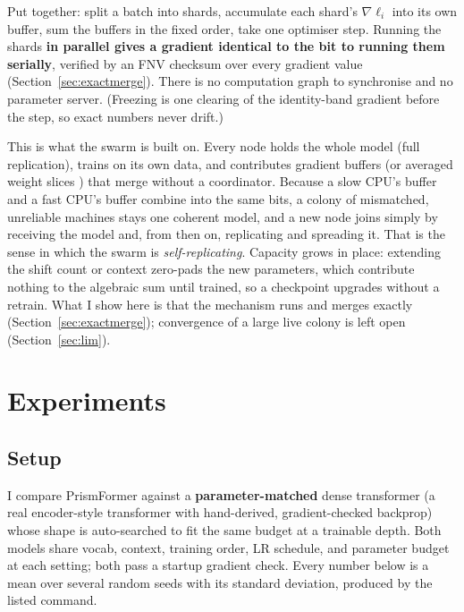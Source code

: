 \documentclass[11pt]{article}
\begin{document}
Put together: split a batch into shards, accumulate each shard's $\nabla \ell_i$ into its own buffer,
sum the buffers in the fixed order, take one optimiser step. Running the shards \textbf{in parallel
gives a gradient identical to the bit to running them serially}, verified by an FNV checksum over every
gradient value (Section~\ref{sec:exactmerge}). There is no computation graph to synchronise and no
parameter server. (Freezing is one clearing of the identity-band gradient before the step, so exact
numbers never drift.)

This is what the swarm is built on. Every node holds the whole model (full replication), trains on its
own data, and contributes gradient buffers (or averaged weight slices \parencite{mcmahan2017fedavg}) that merge
without a coordinator. Because a slow CPU's buffer and a fast CPU's buffer combine into the same bits, a
colony of mismatched, unreliable machines stays one coherent model, and a new node joins simply by
receiving the model and, from then on, replicating and spreading it. That is the sense in which the
swarm is \emph{self-replicating}. Capacity grows in place: extending the shift count or context
zero-pads the new parameters, which contribute nothing to the algebraic sum until trained, so a
checkpoint upgrades without a retrain. What I show here is that the mechanism runs and merges exactly
(Section~\ref{sec:exactmerge}); convergence of a large live colony is left open (Section~\ref{sec:lim}).

\section{Experiments}

\subsection{Setup}

I compare PrismFormer against a \textbf{parameter-matched} dense transformer (a real encoder-style
transformer with hand-derived, gradient-checked backprop) whose shape is auto-searched to fit the same
budget at a trainable depth. Both models share vocab, context, training order, LR schedule, and
parameter budget at each setting; both pass a startup gradient check. Every number below is a mean over
several random seeds with its standard deviation, produced by the listed command.
\end{document}
